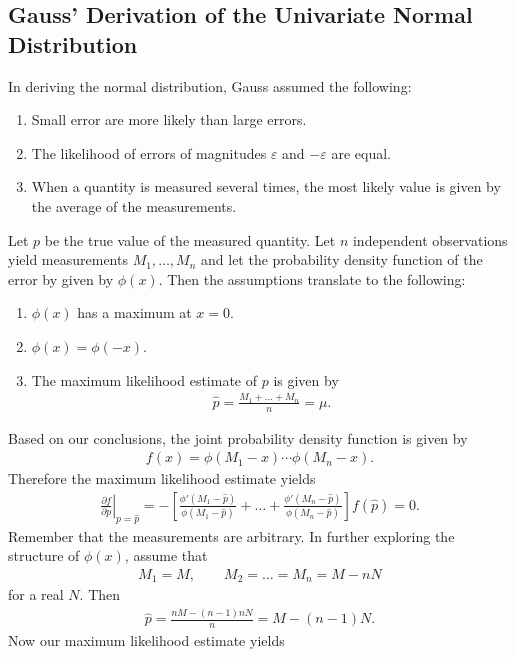 \documentclass{memoir}
\begin{document}
\subsection{Gauss' Derivation of the Univariate Normal Distribution}
In deriving the normal distribution, Gauss assumed the following:
\begin{enumerate}
    \item Small error are more likely than large errors.
    \item The likelihood of errors of magnitudes $\varepsilon$ and $-\varepsilon$ are equal.
    \item When a quantity is measured several times, the most likely value is given by the average of the measurements.
\end{enumerate}
Let $p$ be the true value of the measured quantity. Let $n$ independent observations yield measurements $M_1,\ldots,M_n$ and let the probability density function of the error by given by $\phi(x)$. Then the assumptions translate to the following:
\begin{enumerate}
    \item $\phi(x)$ has a maximum at $x=0$.
    \item $\phi(x)=\phi(-x)$.
    \item The maximum likelihood estimate of $p$ is given by
    \begin{align*}
        \hat{p} = \frac{M_1 + \ldots + M_n}{n} = \mu.
    \end{align*}
\end{enumerate}
Based on our conclusions, the joint probability density function is given by
\begin{align*}
    f(x) = \phi(M_1 - x)\cdots\phi(M_n-x).
\end{align*}
Therefore the maximum likelihood estimate yields
\begin{align*}
    \left.\frac{\partial f}{\partial p}\right|_{p=\hat{p}}=
    -\left[\frac{\phi'(M_1-\hat{p})}{\phi(M_1-\hat{p})} + \ldots + \frac{\phi'(M_n-\hat{p})}{\phi(M_n-\hat{p})}\right]f(\hat{p})=0.
\end{align*}
Remember that the measurements are arbitrary. In further exploring the structure of $\phi(x)$, assume that
\begin{align*}
    M_1 = M, \qquad M_2=\ldots=M_n=M-nN
\end{align*}
for a real $N$. Then
\begin{align*}
    \hat{p}=\frac{nM - (n-1)nN}{n} =M-(n-1)N.
\end{align*}
Now our maximum likelihood estimate yields
\end{document}
